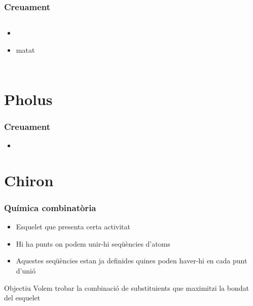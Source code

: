 \documentclass{beamer}
\begin{document}
\begin{frame}
	\frametitle{Creuament }
	\begin{columns}[c]
		\begin{itemize}
			\item 
				\pause
			\item matat
		\end{itemize}
	\end{columns}
\end{frame}

\section{Pholus} %
\label{sec:Pholus}

\begin{frame}
	\frametitle{Creuament }
	\begin{itemize}
		\item 
	\end{itemize}
\end{frame}

\section{Chiron} %
\label{sec:Chiron}
\begin{frame}
	\frametitle{Química combinatòria}
	\begin{itemize}
		\item Esquelet que presenta certa activitat
		\item Hi ha punts on podem unir-hi seqüències d'atoms
		\item Aquestes seqüències estan ja definides quines poden haver-hi en cada punt d'unió
	\end{itemize}
	\pause
	\begin{block}{Objectiu}
		Volem trobar la combinació de substituients que maximitzi la bondat del esquelet
	\end{block}
\end{frame}
\end{document}
